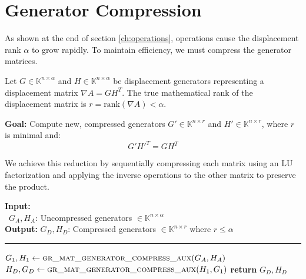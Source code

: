\section{Generator Compression}
\label{ch:compression}

As shown at the end of section \ref{ch:operations},
operations cause the displacement rank $\alpha$ to grow rapidly.
To maintain efficiency, we must compress the generator
matrices.

Let $G \in \mathbb{K}^{n \times \alpha}$ and $H \in \mathbb{K}^{n
\times \alpha}$ be displacement generators representing a
displacement matrix $\nabla A = G H^T$. The true mathematical rank of
the displacement matrix is $r = \text{rank}(\nabla A) < \alpha$.

\vspace{0.5em}
\noindent\textbf{Goal:} Compute new, compressed generators $G' \in
\mathbb{K}^{n \times r}$ and $H' \in \mathbb{K}^{n \times r}$, where
$r$ is minimal and:
\[
  G'H'^T = G H^T
\]

We achieve this reduction by sequentially compressing each matrix
using an LU factorization and applying the inverse operations to the
other matrix to preserve the product.

\begin{algorithm}[H]
  \caption{Generator Compression} \label{alg:generator_compression}

  \textbf{Input:} \\
  \hspace*{0.5cm} \textbullet \ $G_A, H_A$: Uncompressed generators
  $\in \mathbb{K}^{n \times \alpha}$ \\
  \textbf{Output:} $G_D, H_D$: Compressed generators $\in
  \mathbb{K}^{n \times r}$ where $r \le \alpha$

  \vspace{0.15cm}
  \hrule
  \vspace{0.15cm}

  \begin{algorithmic}[1]
    \State $G_1, H_1 \gets \Call{gr\_mat\_generator\_compress\_aux}{G_A, H_A}$
    \State $H_D, G_D \gets \Call{gr\_mat\_generator\_compress\_aux}{H_1, G_1}$
    \State \textbf{return} $G_D, H_D$
    \EndFunction
  \end{algorithmic}
\end{algorithm}

